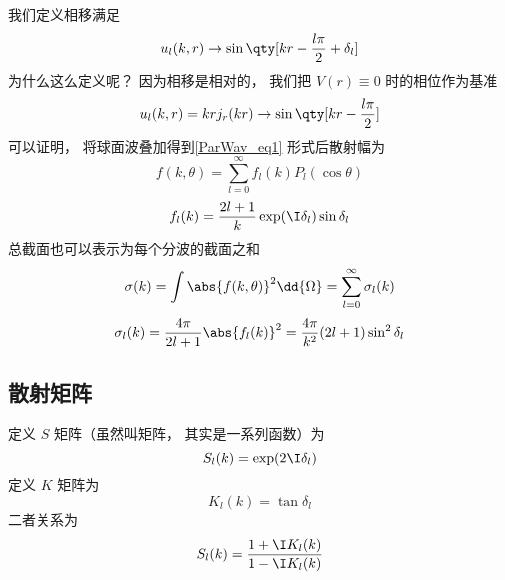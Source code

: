 我们定义相移满足
\begin{equation}
u_l(k, r) \to \sin\qty[kr - \frac{l\pi}{2} + \delta_l]
\end{equation}
为什么这么定义呢？ 因为相移是相对的， 我们把 $V(r) \equiv 0$ 时的相位作为基准
\begin{equation}
u_l(k, r) = kr j_r(kr) \to \sin\qty[kr - \frac{l\pi}{2}]
\end{equation}
可以证明， 将球面波叠加得到\autoref{ParWav_eq1} 形式后散射幅为
\begin{equation}
f(k, \theta) = \sum_{l=0}^\infty f_l(k) P_l(\cos\theta)
\end{equation}
\begin{equation}
f_l(k) = \frac{2l+1}{k} \exp(\I\delta_l) \sin\delta_l
\end{equation}
总截面也可以表示为每个分波的截面之和
\begin{equation}
\sigma(k) = \int \abs{f(k,\theta)}^2 \dd{\Omega} = \sum_{l=0}^\infty \sigma_l(k)
\end{equation}
\begin{equation}
\sigma_l(k) = \frac{4\pi}{2l+1} \abs{f_l(k)}^2 = \frac{4\pi}{k^2} (2l + 1) \sin^2 \delta_l
\end{equation}

\subsection{散射矩阵}
定义 $S$ 矩阵（虽然叫矩阵， 其实是一系列函数）为
\begin{equation}
S_l(k) = \exp(2\I\delta_l)
\end{equation}
定义 $K$ 矩阵为
\begin{equation}
K_l(k) = \tan \delta_l
\end{equation}
二者关系为
\begin{equation}
S_l(k) = \frac{1 + \I K_l(k)}{1 - \I K_l(k)}
\end{equation}


